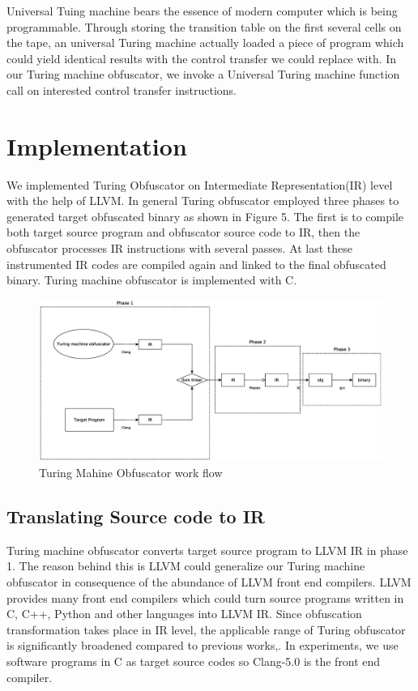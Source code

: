 \documentclass[lnicst]{svmultln}
\begin{document}
Universal Tuing machine bears the essence of modern computer which is being programmable. Through storing the transition table on the first several cells on the tape, an universal Turing machine actually loaded a piece of program which could yield identical results with the control transfer we could replace with. In our Turing machine obfuscator, we invoke a Universal Turing machine function call on interested control transfer instructions.
\section{Implementation}
We implemented Turing Obfuscator on Intermediate Representation(IR) level with the help of LLVM\cite{LLVM}. In general Turing obfuscator employed three phases to generated target obfuscated binary as shown in Figure 5. The first is to compile both target source program and obfuscator source code to IR, then the obfuscator processes IR instructions with several passes. At last these instrumented IR codes are compiled again and linked to the final obfuscated binary. Turing machine obfuscator is implemented with C. 
\begin{figure}
 \includegraphics[width=\linewidth]{llvm-flow.eps}
 \caption{Turing Mahine Obfuscator work flow}
 \label{Figure 5}
\end{figure}
\subsection{Translating Source code to IR}
Turing machine obfuscator converts target source program to LLVM IR in phase 1. The reason behind this is LLVM could generalize our Turing machine obfuscator in consequence of the abundance of LLVM front end compilers. LLVM provides many front end compilers which could turn source programs written in C, C++, Python and other languages into LLVM IR. Since obfuscation transformation takes place in IR level, the applicable range of Turing obfuscator is significantly broadened compared to previous works\cite{Ma},\cite{Zhi}. In experiments, we use software programs in C as target source codes so Clang-5.0 is the front end compiler.
\end{document}
